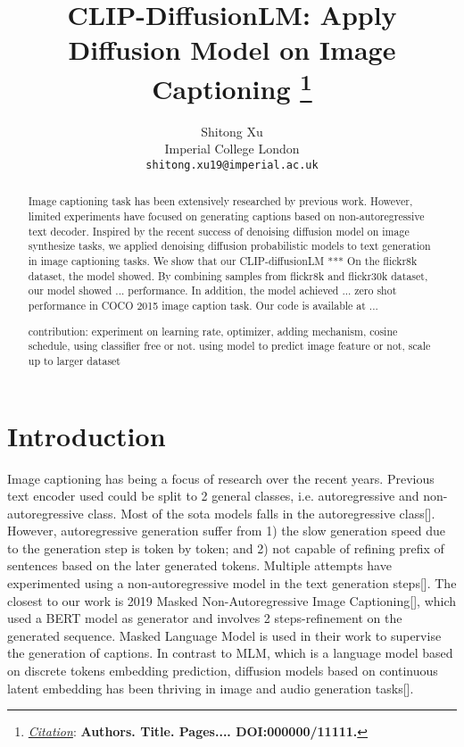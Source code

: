 \documentclass{article}
\title{CLIP-DiffusionLM: Apply Diffusion Model on Image Captioning
\thanks{\textit{\underline{Citation}}: 
\textbf{Authors. Title. Pages.... DOI:000000/11111.}} 
}
\author{
  Shitong Xu \\
  Imperial College London \\
  \texttt{shitong.xu19@imperial.ac.uk} \\
}
\begin{document}
\maketitle


\begin{abstract}
Image captioning task has been extensively researched by previous work. However, limited experiments have focused on generating captions based on non-autoregressive text decoder. Inspired by the recent success of denoising diffusion model on image synthesize tasks, we applied denoising diffusion probabilistic models to text generation in image captioning tasks. We show that our CLIP-diffusionLM *** On the flickr8k dataset, the model showed. By combining samples from flickr8k and flickr30k dataset, our model showed ... performance. In addition, the model achieved ... zero shot performance in COCO 2015 image caption task. Our code is available at ...

contribution: experiment on learning rate, optimizer, adding mechanism, cosine schedule, using classifier free or not. using model to predict image feature or not, scale up to larger dataset
\end{abstract}




\section{Introduction}
Image captioning has being a focus of research over the recent years. Previous text encoder used could be split to 2 general classes, i.e. autoregressive and non-autoregressive class. Most of the sota models falls in the autoregressive class[]. However, autoregressive generation suffer from 1) the slow generation speed due to the generation step is token by token; and 2) not capable of refining prefix of sentences based on the later generated tokens. Multiple attempts have experimented using a non-autoregressive model in the text generation steps[]. The closest to our work is 2019 Masked Non-Autoregressive Image Captioning[], which used a BERT model as generator and involves 2 steps-refinement on the generated sequence. Masked Language Model is used in their work to supervise the generation of captions. In contrast to MLM, which is a language model based on discrete tokens embedding prediction, diffusion models based on continuous latent embedding has been thriving in image and audio generation tasks[]. 
\end{document}
